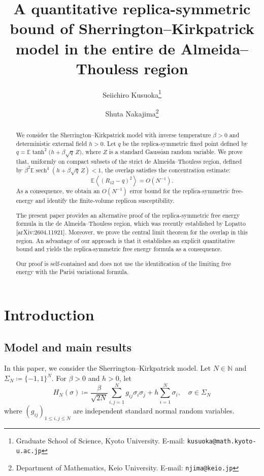 \documentclass[11pt]{article}
\title{A quantitative replica-symmetric bound of Sherrington--Kirkpatrick model in the entire de Almeida--Thouless region}
\author{
  Seiichiro Kusuoka\thanks{Graduate School of Science, Kyoto University. E-mail: \texttt{kusuoka@math.kyoto-u.ac.jp}}
  \and
  Shuta Nakajima\thanks{Department of Mathematics, Keio University. E-mail: \texttt{njima@keio.jp}}
}
\date{}
\numberwithin{equation}{section}
\newcommand{\1}{\mathbf 1}
\newcommand{\sech}{\operatorname{sech}}
\newcommand{\braket}[1]{\left\langle #1\right\rangle}
\begin{document}
\maketitle

\begin{abstract}
We consider the Sherrington--Kirkpatrick model with inverse temperature $\beta>0$ and deterministic external
field $h>0$.  Let $q$ be  the replica-symmetric fixed point defined by 
$ q=\mathbb{E}\tanh^2\bigl(h+\beta\sqrt q\,Z\bigr)$, where $Z$ is a standard Gaussian random variable.  
We prove that, uniformly on compact subsets of the strict de Almeida--Thouless region, defined by $\beta^2\mathbb{E}\sech^4(h+\beta\sqrt q\,Z)<1$, the overlap satisfies the concentration estimate:
$$
 \mathbb{E}\braket{(R_{12}-q)^2}=O(N^{-1}).
$$
  As a consequence, we
obtain an $O(N^{-1})$ error bound for the replica-symmetric free-energy   and
identify the finite-volume replicon susceptibility.

The present paper provides an alternative proof of the replica-symmetric free energy formula in the de Almeida--Thouless region, which was recently established by Lopatto [arXiv:2604.11921]. Moreover, we prove the central limit theorem for the overlap in this region. 
An advantage of our approach is that  it establishes an explicit quantitative bound and yields the replica-symmetric free energy formula  as a consequence. 

Our proof is self-contained and does not use the identification of
the limiting free energy with the Parisi variational formula.

\end{abstract}

\section{Introduction}\label{sec:intro}

\subsection{Model and main results}

In this paper, we consider the Sherrington--Kirkpatrick model.
Let $N \in {\mathbb N}$ and $\Sigma_N\coloneqq\{-1,1\}^N$.  For $\beta>0$ and $h>0$, let
\[
 H_N(\sigma)
 \coloneqq
 \frac{\beta}{\sqrt{2N}}\sum_{i,j=1}^Ng_{ij}\sigma_i\sigma_j
 +h\sum_{i=1}^N\sigma_i , \quad \sigma \in \Sigma _N
\]
where $(g_{ij})_{1\le i,j\le N}$ are independent standard normal random variables. 
\end{document}
